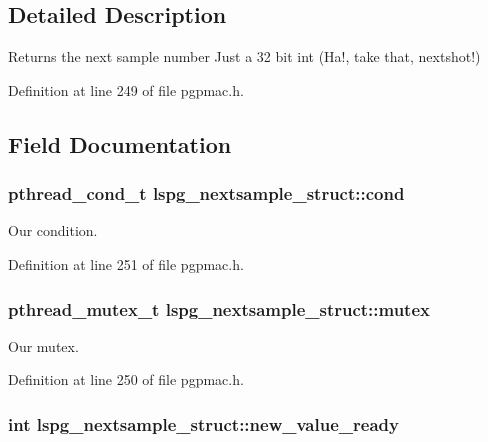 \subsection{Detailed Description}
Returns the next sample number Just a 32 bit int (Ha!, take that, nextshot!) 

Definition at line 249 of file pgpmac.\-h.



\subsection{Field Documentation}
\hypertarget{structlspg__nextsample__struct_a5b46e4537dac3be839f6c3eeff6b46b6}{
\subsubsection[{cond}]{\setlength{\rightskip}{0pt plus 5cm}pthread\-\_\-cond\-\_\-t lspg\-\_\-nextsample\-\_\-struct\-::cond}}\label{structlspg__nextsample__struct_a5b46e4537dac3be839f6c3eeff6b46b6}


Our condition. 



Definition at line 251 of file pgpmac.\-h.

\hypertarget{structlspg__nextsample__struct_a99408b5825e2510f07be199d2cdc3633}{
\subsubsection[{mutex}]{\setlength{\rightskip}{0pt plus 5cm}pthread\-\_\-mutex\-\_\-t lspg\-\_\-nextsample\-\_\-struct\-::mutex}}\label{structlspg__nextsample__struct_a99408b5825e2510f07be199d2cdc3633}


Our mutex. 



Definition at line 250 of file pgpmac.\-h.

\hypertarget{structlspg__nextsample__struct_ab1c9e9d3dc5140137a7ccf908e95f69e}{
\subsubsection[{new\-\_\-value\-\_\-ready}]{\setlength{\rightskip}{0pt plus 5cm}int lspg\-\_\-nextsample\-\_\-struct\-::new\-\_\-value\-\_\-ready}}\label{structlspg__nextsample__struct_ab1c9e9d3dc5140137a7ccf908e95f69e}



